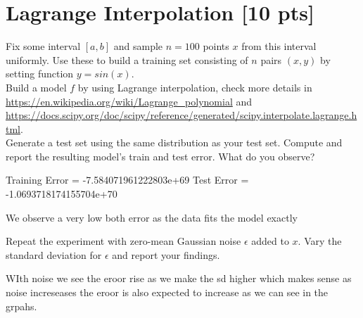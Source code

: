 \documentclass[a4paper]{article}
\theoremstyle{definition}
\begin{document}
\section{Lagrange Interpolation [10 pts]}
Fix some interval $[a, b]$ and sample $n = 100$ points $x$ from this interval uniformly. Use these to build a training set consisting of $n$ pairs $(x, y)$ by setting function $y = sin(x)$. \\

Build a model $f$ by using Lagrange interpolation, check more details in \url{https://en.wikipedia.org/wiki/Lagrange_polynomial} and \url{https://docs.scipy.org/doc/scipy/reference/generated/scipy.interpolate.lagrange.html}. \\

Generate a test set using the same distribution as your test set. Compute and report the resulting model’s train and test error. What do you observe?

Training Error =  -7.584071961222803e+69
Test Error =  -1.0693718174155704e+70

We observe a very low both error as the data fits the model exactly

Repeat the experiment with zero-mean Gaussian noise $\epsilon$ added to $x$. Vary the standard deviation for $\epsilon$ and report your findings.


WIth noise we see the eroor rise as we make the sd higher which makes sense as noise increseases the eroor is also expected to increase as we can see in the grpahs.
\end{document}
